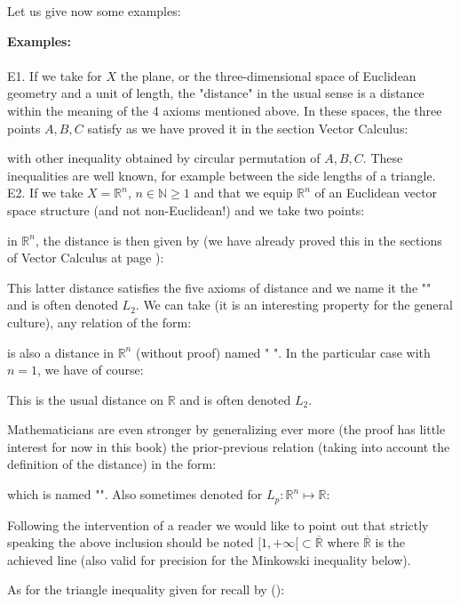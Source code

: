 	Let us give now some examples:
	\begin{tcolorbox}[colframe=black,colback=white,sharp corners,breakable]
	\textbf{{\Large {}}Examples:}\\\\
	E1. If we take for $X$ the plane, or the three-dimensional space of Euclidean geometry and a unit of length, the "distance" in the usual sense is a distance within the meaning of the 4 axioms mentioned above. In these spaces, the three points $A, B, C$ satisfy as we have proved it in the section Vector Calculus:
	
	with other inequality obtained by circular permutation of $A, B, C$. These inequalities are well known, for example between the side lengths of a triangle.\\
	
	E2. If we take $X=\mathbb{R}^n$, $n \in \mathbb{N} \geq 1$ and that we equip $\mathbb{R}^n$ of an Euclidean vector space structure (and not non-Euclidean!) and we take two points:
	
	in $\mathbb{R}^n$, the distance is then given by (we have already proved this in the sections of Vector Calculus at page \pageref{euclidean distance vector}):
	
	\end{tcolorbox}
	\label{euclidean topology}This latter distance satisfies the five axioms of distance and we name it the "" and is often denoted $L_2$. We can take (it is an interesting property for the general culture), any relation of the form:
	
	is also a distance in $\mathbb{R}^n$ (without proof) named " ". In the particular case with $n=1$, we have of course:
	
	This is the usual distance on $\mathbb{R}$ and is often denoted $L_2$.
	
	Mathematicians are even stronger by generalizing ever more (the proof has little interest for now in this book) the prior-previous relation (taking into account the definition of the distance) in the form:
	
	which is named "". Also sometimes denoted for $L_p:\mathbb{R}^n\mapsto\mathbb{R}$:
	
	\begin{tcolorbox}[title=Remark,arc=10pt,breakable,drop lifted shadow,
  skin=enhanced,
  skin first is subskin of={enhancedfirst}{arc=10pt,no shadow},
  skin middle is subskin of={enhancedmiddle}{arc=10pt,no shadow},
  skin last is subskin of={enhancedlast}{drop lifted shadow}]
	Following the intervention of a reader we would like to point out that strictly speaking the above inclusion should be noted $[1,+\infty[ \subset \mathbb{\overline{R}}$ where $\mathbb{\overline{R}}$ is the achieved line (also valid for precision for the Minkowski inequality below).
	\end{tcolorbox}	
	As for the triangle inequality given for recall by ():
	
